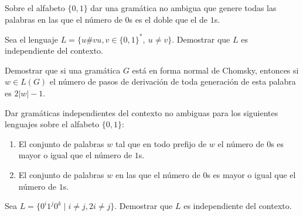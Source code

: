 \begin{ejercicio}\label{ej:1.4.17}
    Sobre el alfabeto $\{ 0, 1 \}$ dar una gramática no ambigua que genere todas las palabras en las que el número de $0$s es el doble que el de $1$s.
\end{ejercicio}

\begin{ejercicio}\label{ej:1.4.18}
    Sea el lenguaje $L = \{ u\#v u,v\in \{0,1\}^*,~u\neq v\}$. Demostrar que $L$ es independiente del contexto.
\end{ejercicio}

\begin{ejercicio}\label{ej:1.4.19}
    Demostrar que si una gramática $G$ está en forma normal de Chomsky, entonces si $w \in L(G)$ el número de pasos de derivación de toda generación de esta palabra es $2|w| - 1$.
\end{ejercicio}

\begin{ejercicio}\label{ej:1.4.20}
    Dar gramáticas independientes del contexto no ambiguas para los siguientes lenguajes sobre el alfabeto $\{ 0, 1 \}$:
    \begin{enumerate}
        \item El conjunto de palabras $w$ tal que en todo prefijo de $w$ el número de $0$s es mayor o igual que el número de $1$s.
        \item El conjunto de palabras $w$ en las que el número de $0$s es mayor o igual que el número de $1$s.
    \end{enumerate}
\end{ejercicio}

\begin{ejercicio}\label{ej:1.4.21}
    Sea $L = \{ 0^i 1^j 0^k \mid i \neq j, 2i \neq j \}$. Demostrar que $L$ es independiente del contexto.
\end{ejercicio}

